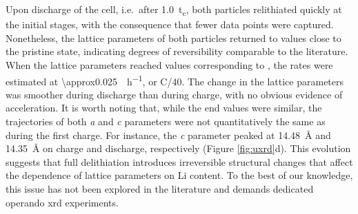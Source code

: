 \documentclass{WileyMSP-template}
\begin{document}
Upon discharge of the cell, i.e.\ after \SI{1.0}{t_c}, both particles
relithiated quickly at the initial stages, with the consequence that
fewer data points were captured. Nonetheless, the lattice parameters
of both particles returned to values close to the pristine state,
indicating degrees of reversibility comparable to the
literature\cite{robert2015}. When the lattice parameters reached
values corresponding to , the rates were estimated at
\SI{\approx0.025}{\per\hour}, or C/40. The change in the
lattice parameters was smoother during discharge than during charge,
with no obvious evidence of acceleration. It is worth noting that,
while the end values were similar, the trajectories of both \emph{a}
and \emph{c} parameters were not quantitatively the same as during the
first charge. For instance, the \emph{c} parameter peaked at
\SI{14.48}{\angstrom} and \SI{14.35}{\angstrom} on charge and
discharge, respectively (Figure \ref{fig:uxrd}d). This evolution
suggests that full delithiation introduces irreversible structural
changes that affect the dependence of lattice parameters on Li
content. To the best of our knowledge, this issue has not been
explored in the literature and demands dedicated operando \gls{xrd}
experiments.



\end{document}

